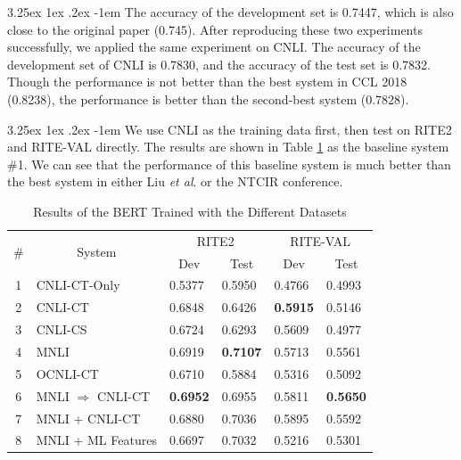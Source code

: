 \documentclass[12pt]{article}
\makeatletter
\renewcommand\paragraph{\@startsection{paragraph}{5}{\z@}%
  {3.25ex \@plus1ex \@minus.2ex}%
  {-1em}%
  {\normalfont\normalsize\bfseries}}
\makeatother
\begin{document}
\begin{CJK*}{UTF8}{bkai}
\begin{spacing}{1.77}
\paragraph{}
The accuracy of the development set is 0.7447, which is also close to the original paper (0.745). After reproducing these two experiments successfully, we applied the same experiment on CNLI. The accuracy of the development set of CNLI is 0.7830, and the accuracy of the test set is 0.7832. Though the performance is not better than the best system in CCL 2018 (0.8238), the performance is better than the second-best system (0.7828).

\paragraph{}
We use CNLI as the training data first, then test on RITE2 and RITE-VAL directly. The results are shown in Table \ref{result:bert_compare} as the baseline system \#1. We can see that the performance of this baseline system is much better than the best system in either Liu \emph{et al}. or the NTCIR conference.

\begin{table}[H]
  \centering
  \setlength{\extrarowheight}{-3pt}
  \caption{Results of the BERT Trained with the Different Datasets}
  \label{result:bert_compare}
  \begin{tabular}{|c|l|l|l|l|l|}
  \hline
  \multirow{2}{*}{\#} & \multicolumn{1}{c|}{\multirow{2}{*}{System}} & \multicolumn{2}{c|}{RITE2} & \multicolumn{2}{c|}{RITE-VAL} \\ \cline{3-6}
   & \multicolumn{1}{c|}{} & \multicolumn{1}{c|}{Dev} & \multicolumn{1}{c|}{Test} & \multicolumn{1}{c|}{Dev} & \multicolumn{1}{c|}{Test} \\ \hline
  1 & CNLI-CT-Only & 0.5377 & 0.5950 & 0.4766 & 0.4993 \\ \hline
  2 & CNLI-CT & 0.6848 & 0.6426 & \textbf{0.5915} & 0.5146 \\ \hline
  3 & CNLI-CS & 0.6724 & 0.6293 & 0.5609 & 0.4977 \\ \hline
  4 & MNLI & 0.6919 & \textbf{0.7107} & 0.5713 & 0.5561 \\ \hline
  5 & OCNLI-CT & 0.6710 & 0.5884 & 0.5316 & 0.5092 \\ \hline
  6 & MNLI $\Rightarrow$ CNLI-CT & \textbf{0.6952} & 0.6955 & 0.5811 & \textbf{0.5650} \\ \hline
  7 & MNLI + CNLI-CT & 0.6880 & 0.7036 & 0.5895 & 0.5592 \\ \hline
  8 & MNLI + ML Features & 0.6697 & 0.7032 & 0.5216 & 0.5301 \\ \hline
  \end{tabular}
\end{table}


\end{spacing}
\end{CJK*}
\end{document}
